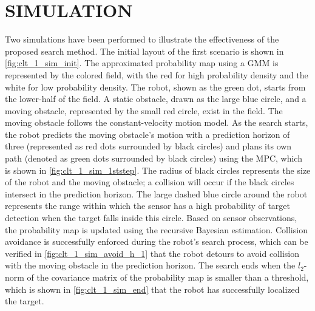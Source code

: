 \documentclass[twocolumn,10pt]{asme2e}
\begin{document}
\section*{SIMULATION}\label{sec:simulation}
Two simulations have been performed to illustrate the effectiveness of the proposed search method.
The initial layout of the first scenario is shown in \cref{fig:clt_1_sim_init}.
The approximated probability map using a GMM is represented by the colored field, with the red for high probability density and the white for low probability density.
The robot, shown as the green dot, starts from the lower-half of the field. 
A static obstacle, drawn as the large blue circle, and a moving obstacle, represented by the small red circle, exist in the field.
The moving obstacle follows the constant-velocity motion model.
As the search starts, the robot predicts the moving obstacle's motion with a prediction horizon of three (represented as red dots surrounded by black circles) and plans its own path (denoted as green dots surrounded by black circles) using the MPC, which is shown in \cref{fig:clt_1_sim_1ststep}.
The radius of black circles represents the size of the robot and the moving obstacle; a collision will occur if the black circles intersect in the prediction horizon.
The large dashed blue circle around the robot represents the range within which the sensor has a high probability of target detection when the target falls inside this circle.
Based on sensor observations, the probability map is updated using the recursive Bayesian estimation.
Collision avoidance is successfully enforced during the robot's search process, which can be verified in \cref{fig:clt_1_sim_avoid_h_1} that the robot detours to avoid collision with the moving obstacle in the prediction horizon.
The search ends when the $l_2$-norm of the covariance matrix of the probability map is smaller than a threshold, which is shown in \cref{fig:clt_1_sim_end} that the robot has successfully localized the target.
\end{document}
